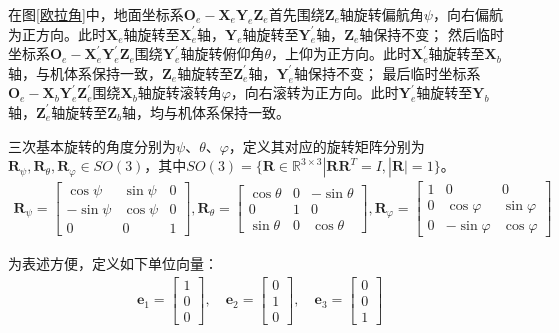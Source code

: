 在图\ref{欧拉角}中，地面坐标系$\boldsymbol{O}_e-\boldsymbol{X}_e\boldsymbol{Y}_e\boldsymbol{Z}_e$首先围绕$\boldsymbol{Z}_e$轴旋转偏航角$\psi$，向右偏航为正方向。此时$\boldsymbol{X}_e$轴旋转至$\boldsymbol{X}_e^{'}$轴，$\boldsymbol{Y}_e$轴旋转至$\boldsymbol{Y}_e^{'}$轴，$\boldsymbol{Z}_e$轴保持不变；
然后临时坐标系$\boldsymbol{O}_e-\boldsymbol{X}_e^{'}\boldsymbol{Y}_e^{'}\boldsymbol{Z}_e$围绕$\boldsymbol{Y}_e^{'}$轴旋转俯仰角$\theta$，上仰为正方向。此时$\boldsymbol{X}_e^{'}$轴旋转至$\boldsymbol{X}_b$轴，与机体系保持一致，$\boldsymbol{Z}_e$轴旋转至$\boldsymbol{Z}_e^{'}$轴，$\boldsymbol{Y}_e^{'}$轴保持不变；
最后临时坐标系$\boldsymbol{O}_e-\boldsymbol{X}_b\boldsymbol{Y}_e^{'}\boldsymbol{Z}_e^{'}$围绕$\boldsymbol{X}_b$轴旋转滚转角$\varphi$，向右滚转为正方向。此时$\boldsymbol{Y}_e^{'}$轴旋转至$\boldsymbol{Y}_b$轴，$\boldsymbol{Z}_e^{'}$轴旋转至$\boldsymbol{Z}_b$轴，均与机体系保持一致。

三次基本旋转的角度分别为$\psi$、$\theta$、$\varphi$，定义其对应的旋转矩阵分别为$\boldsymbol{R}_\psi,\boldsymbol{R}_\theta,\boldsymbol{R}_\varphi\in{SO(3)}$，其中$SO(3)=\{\boldsymbol{R}\in\mathbb{R}^{3\times3}|\boldsymbol{R}\boldsymbol{R}^T=I,|\boldsymbol{R}|=1\}$。
\begin{equation}
    \begin{aligned} %
\boldsymbol{R}_\psi=\begin{bmatrix}\cos\psi & \sin\psi & 0 \\-\sin\psi & \cos\psi & 0 \\0 & 0 & 1\end{bmatrix},\boldsymbol{R}_\theta=\begin{bmatrix}\cos\theta & 0 & -\sin\theta \\0 & 1 & 0 \\\sin\theta & 0 & \cos\theta\end{bmatrix},\boldsymbol{R}_\varphi=\begin{bmatrix}1 & 0 & 0\\0 & \cos\varphi & \sin\varphi \\0 & -\sin\varphi & \cos\varphi\end{bmatrix}\label{eq_1}
    \end{aligned}
\end{equation}

为表述方便，定义如下单位向量：
\begin{equation}
    \begin{aligned}
\boldsymbol{e}_1=\begin{bmatrix}1 \\0 \\0\end{bmatrix},
\quad\boldsymbol{e}_2=\begin{bmatrix}0 \\1 \\0\end{bmatrix},
\quad\boldsymbol{e}_3=\begin{bmatrix}0 \\0 \\1\end{bmatrix}\label{eq_2}
    \end{aligned}
\end{equation}

